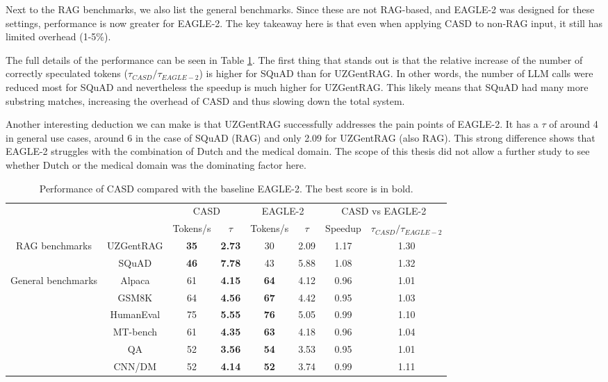 Next to the RAG benchmarks, we also list the general benchmarks. Since these are not RAG-based, and EAGLE-2 was designed for these settings, performance is now greater for EAGLE-2. The key takeaway here is that even when applying CASD to non-RAG input, it still has limited overhead (1-5\%).

The full details of the performance can be seen in Table \ref{tab:performance_benchmarks}. The first thing that stands out is that the relative increase of the number of correctly speculated tokens ($\tau_{CASD} / \tau_{EAGLE-2}$) is higher for SQuAD than for UZGentRAG. In other words, the number of LLM calls were reduced most for SQuAD and nevertheless the speedup is much higher for UZGentRAG. This likely means that SQuAD had many more substring matches, increasing the overhead of CASD and thus slowing down the total system.

Another interesting deduction we can make is that UZGentRAG successfully addresses the pain points of EAGLE-2. It has a $\tau$ of around 4 in general use cases, around 6 in the case of SQuAD (RAG) and only 2.09 for UZGentRAG (also RAG). This strong difference shows that EAGLE-2 struggles with the combination of Dutch and the medical domain. The scope of this thesis did not allow a further study to see whether Dutch or the medical domain was the dominating factor here.

\begin{table}[h]
    \centering
    \begin{tabular}{cccc|cc|cc}
        & & \multicolumn{2}{c}{CASD} & \multicolumn{2}{c}{EAGLE-2} & \multicolumn{2}{c}{CASD vs EAGLE-2} \\
        \cline{3-8}
        & & Tokens/s & $\tau$ & Tokens/s & $\tau$ & Speedup & $\tau_{CASD} / \tau_{EAGLE-2}$ \\
        \hline
        \multirow{2}{*}{RAG benchmarks} & UZGentRAG & \textbf{35} & \textbf{2.73} & 30 & 2.09 & 1.17 & 1.30 \\
        & SQuAD             & \textbf{46} & \textbf{7.78} & 43 & 5.88 & 1.08 & 1.32 \\
        \hline
        \multirow{6}{*}{General benchmarks} & Alpaca & 61 & \textbf{4.15} & \textbf{64} & 4.12 & 0.96 & 1.01 \\
        & GSM8K             & 64 & \textbf{4.56} & \textbf{67} & 4.42 & 0.95 & 1.03 \\
        & HumanEval         & 75 & \textbf{5.55} & \textbf{76} & 5.05 & 0.99 & 1.10 \\
        & MT-bench          & 61 & \textbf{4.35} & \textbf{63} & 4.18 & 0.96 & 1.04 \\
        & QA                & 52 & \textbf{3.56} & \textbf{54} & 3.53 & 0.95 & 1.01 \\
        & CNN/DM            & 52 & \textbf{4.14} & \textbf{52} & 3.74 & 0.99 & 1.11 \\
        \hline
    \end{tabular}
    \caption{Performance of CASD compared with the baseline EAGLE-2. The best score is in bold.}
    \label{tab:performance_benchmarks}
\end{table}

